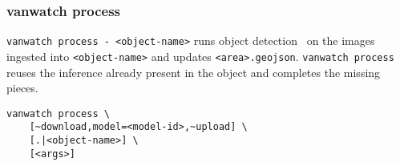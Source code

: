 \subsubsection{vanwatch process}
\label{vanwatch_process}

\texttt{vanwatch process - <object-name>} runs object detection~ on the images ingested into \texttt{<object-name>} and updates \texttt{<area>.geojson}. \texttt{vanwatch process} reuses the inference already present in the object and completes the missing pieces.

\begin{verbatim}
vanwatch process \
    [~download,model=<model-id>,~upload] \
    [.|<object-name>] \
    [<args>]
\end{verbatim}
